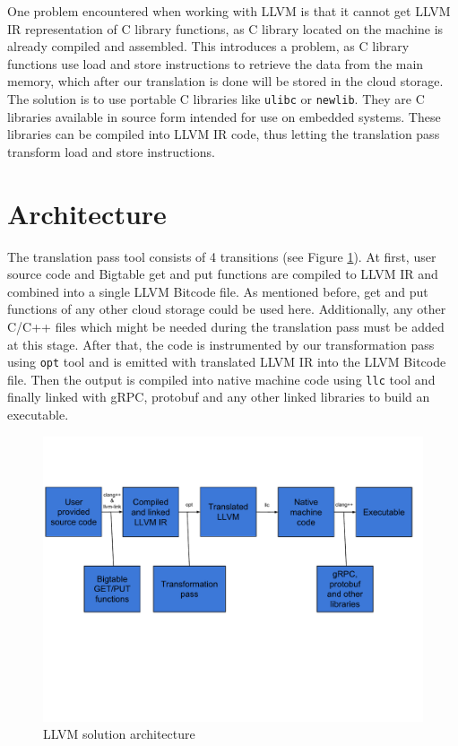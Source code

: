 \documentclass[bsc,frontabs,twoside,singlespacing,parskip,deptreport]{infthesis}     %
\begin{document}
One problem encountered when working with LLVM is that it cannot get LLVM IR representation of C library functions, as C library located on the machine is already compiled and assembled. This introduces a problem, as C library functions use load and store instructions to retrieve the data from the main memory, which after our translation is done will be stored in the cloud storage. The solution is to use portable C libraries like \texttt{ulibc} or \texttt{newlib}. They are C libraries available in source form intended for use on embedded systems. These libraries can be compiled into LLVM IR code, thus letting the translation pass transform load and store instructions.

\section{Architecture}
\label{architecture}

The translation pass tool consists of 4 transitions (see Figure \ref{fig:architecture}). At first, user source code and Bigtable get and put functions are compiled to LLVM IR and combined into a single LLVM Bitcode file. As mentioned before, get and put functions of any other cloud storage could be used here. Additionally, any other C/C++ files which might be needed during the translation pass must be added at this stage. After that, the code is instrumented by our transformation pass using \texttt{opt} tool and is emitted with translated LLVM IR into the LLVM Bitcode file. Then the output is compiled into native machine code using \texttt{llc} tool and finally linked with gRPC, protobuf and any other linked libraries to build an executable.

\begin{figure}[H]
\centering
\includegraphics[width=1\textwidth]{images/architecture}
\caption{LLVM solution architecture}
\label{fig:architecture}
\end{figure}
\end{document}
